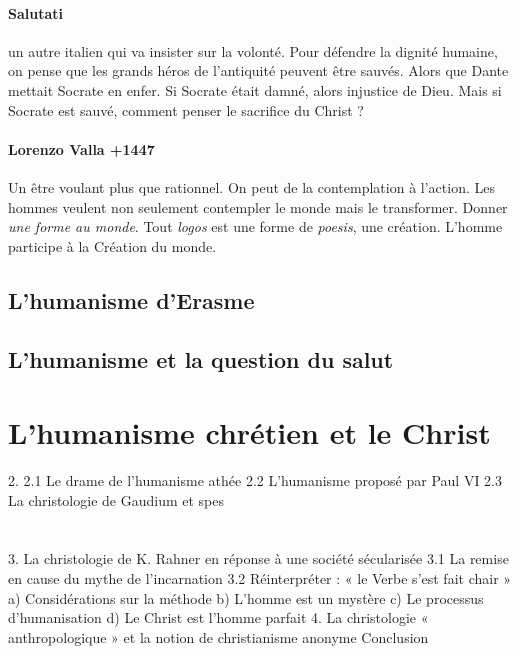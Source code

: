\paragraph{Salutati} un autre italien qui va insister sur la volonté. Pour défendre la dignité humaine, on pense que les grands héros de l'antiquité peuvent être sauvés. Alors que Dante mettait Socrate en enfer. Si Socrate était damné, alors injustice de Dieu. Mais si Socrate est sauvé, comment penser le sacrifice du Christ ?

\paragraph{Lorenzo Valla +1447} Un être voulant plus que rationnel. On peut de la contemplation à l'action. Les hommes veulent non seulement contempler le monde mais le transformer. Donner \textit{une forme au monde}. Tout \textit{logos} est une forme de \textit{poesis}, une création. L'homme participe à la Création du monde.



\subsection{L’humanisme d’Erasme } 

\subsection{L’humanisme et la question du salut } 

\section{L’humanisme chrétien et le Christ }
2. 2.1 Le drame de l’humanisme athée 2.2 L’humanisme proposé par Paul VI 2.3 La christologie de Gaudium et spes 



\section{}3. La christologie de K. Rahner en réponse à une société sécularisée 3.1 La remise en cause du mythe de l’incarnation 3.2 Réinterpréter : « le Verbe s’est fait chair » a) Considérations sur la méthode b) L’homme est un mystère c) Le processus d’humanisation  d) Le Christ est l’homme parfait 4. La christologie « anthropologique » et la notion de christianisme anonyme Conclusion  